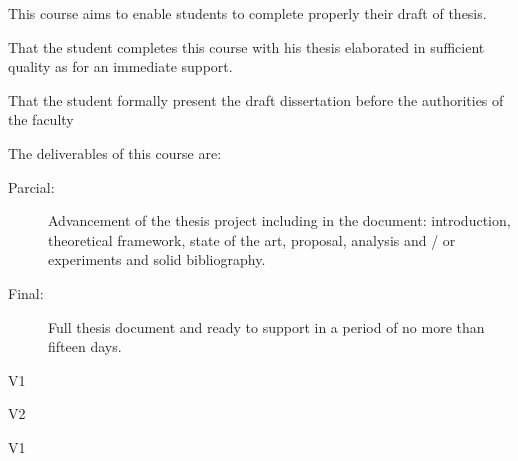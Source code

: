 \begin{syllabus}


\begin{justification}
This course aims to enable students to complete properly their draft of  thesis.
\end{justification}

\begin{goals}
\item That the student completes this course with his thesis elaborated in sufficient quality as for an immediate support.
\item That the student formally present the draft dissertation before the authorities of the faculty
\item The deliverables of this course are:
	\begin{description}
	\item [Parcial:]Advancement of the thesis project including in the document: introduction, theoretical framework, state of the art, proposal, analysis and / or experiments and solid bibliography.
	\item [Final:] Full thesis document and ready to support in a period of no more than fifteen days.
	\end{description}
\end{goals}

\begin{outcomes}{V1}
\item {}
\item {}
\item {}
\item {}
\item {}
\item {}
\item {}
\item {}
\end{outcomes}

\begin{outcomes}{V2}
\item {}
\item {}
\item {}
\item {}
\end{outcomes}

\begin{competences}{V1}
\item {} 
\item {}
\item {}
\end{competences}


\end{syllabus}
